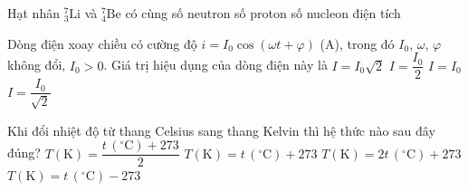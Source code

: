 	\begin{ex}%
		Hạt nhân ${}^7_3\text{Li}$ và ${}^7_4\text{Be}$ có cùng
		\choice
		{số neutron}
		{số proton}
		{\True số nucleon}
		{điện tích}
	\end{ex}

	\begin{ex}%
		Dòng điện xoay chiều có cường độ $i=I_0\cos(\omega t+\varphi)$ (A), trong đó $I_0$, $\omega$, $\varphi$ không đổi, $I_0>0$. Giá trị hiệu dụng của dòng điện này là
		\choice
		{$I=I_0\sqrt{2}$}
		{$I=\dfrac{I_0}{2}$}
		{$I=I_0$}
		{\True $I=\dfrac{I_0}{\sqrt{2}}$}
	\end{ex}

	\begin{ex}%
		Khi đổi nhiệt độ từ thang Celsius sang thang Kelvin thì hệ thức nào sau đây đúng?
		\choice
		{$T(\text{K})=\dfrac{t\,(^\circ\text{C})+273}{2}$}
		{\True $T(\text{K})=t\,(^\circ\text{C})+273$}
		{$T(\text{K})=2t\,(^\circ\text{C})+273$}
		{$T(\text{K})=t\,(^\circ\text{C})-273$}
	\end{ex}

